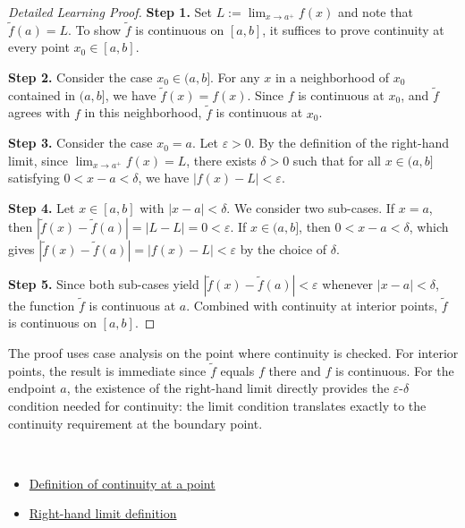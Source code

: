 \begin{proof}[Detailed Learning Proof]
\LRAProofBodyStart

\textbf{Step 1.} Set $L := \lim_{x\to a^+} f(x)$ and note that $\widetilde{f}(a) = L$. To show $\widetilde{f}$ is continuous on $[a,b]$, it suffices to prove continuity at every point $x_0 \in [a,b]$.

\textbf{Step 2.} Consider the case $x_0 \in (a,b]$. For any $x$ in a neighborhood of $x_0$ contained in $(a,b]$, we have $\widetilde{f}(x) = f(x)$. Since $f$ is continuous at $x_0$, and $\widetilde{f}$ agrees with $f$ in this neighborhood, $\widetilde{f}$ is continuous at $x_0$.

\textbf{Step 3.} Consider the case $x_0 = a$. Let $\varepsilon > 0$. By the definition of the right-hand limit, since $\lim_{x\to a^+} f(x) = L$, there exists $\delta > 0$ such that for all $x \in (a,b]$ satisfying $0 < x - a < \delta$, we have $|f(x) - L| < \varepsilon$.

\textbf{Step 4.} Let $x \in [a,b]$ with $|x - a| < \delta$. We consider two sub-cases. If $x = a$, then $|\widetilde{f}(x) - \widetilde{f}(a)| = |L - L| = 0 < \varepsilon$. If $x \in (a,b]$, then $0 < x - a < \delta$, which gives $|\widetilde{f}(x) - \widetilde{f}(a)| = |f(x) - L| < \varepsilon$ by the choice of $\delta$.

\textbf{Step 5.} Since both sub-cases yield $|\widetilde{f}(x) - \widetilde{f}(a)| < \varepsilon$ whenever $|x - a| < \delta$, the function $\widetilde{f}$ is continuous at $a$. Combined with continuity at interior points, $\widetilde{f}$ is continuous on $[a,b]$.
\end{proof}

\begin{remark*}
The proof uses case analysis on the point where continuity is checked. For interior points, the result is immediate since $\widetilde{f}$ equals $f$ there and $f$ is continuous. For the endpoint $a$, the existence of the right-hand limit directly provides the $\varepsilon$-$\delta$ condition needed for continuity: the limit condition translates exactly to the continuity requirement at the boundary point.
\end{remark*}

\begin{remark*}[Dependencies]~\\
\begin{itemize}
  \item \hyperref[def:continuous-at-point]{Definition of continuity at a point}
  \item \hyperref[def:one-sided-limits]{Right-hand limit definition}
\end{itemize}
\end{remark*}
